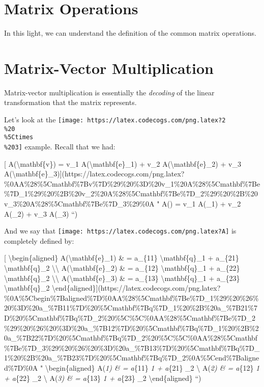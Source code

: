 \documentclass[]{article}
\begin{document}
\hypertarget{matrix-operations}{%
\section{Matrix Operations}\label{matrix-operations}}

In this light, we can understand the definition of the common matrix operations.

\hypertarget{matrix-vector-multiplication}{%
\section{Matrix-Vector Multiplication}\label{matrix-vector-multiplication}}

Matrix-vector multiplication is essentially the \emph{decoding} of the linear
transformation that the matrix represents.

Let's look at the
\texttt{[image: https://latex.codecogs.com/png.latex?2\\\%20\\\%5Ctimes\\\%203]}
example. Recall that we had:

{[} A(\textbackslash{}mathbf\{v\}) = v\_1 A(\textbackslash{}mathbf\{e\}\_1) +
v\_2 A(\textbackslash{}mathbf\{e\}\_2) + v\_3
A(\textbackslash{}mathbf\{e\}\_3){]}(https://latex.codecogs.com/png.latex?\%0AA\%28\%5Cmathbf\%7Bv\%7D\%29\%20\%3D\%20v\_1\%20A\%28\%5Cmathbf\%7Be\%7D\_1\%29\%20\%2B\%20v\_2\%20A\%28\%5Cmathbf\%7Be\%7D\_2\%29\%20\%2B\%20v\_3\%20A\%28\%5Cmathbf\%7Be\%7D\_3\%29\%0A
" A() = v\_1 A(\_1) + v\_2 A(\_2) + v\_3
A(\_3) ``)

And we say that \texttt{[image: https://latex.codecogs.com/png.latex?A]} is
completely defined by:

{[} \textbackslash{}begin\{aligned\} A(\textbackslash{}mathbf\{e\}\_1) \& =
a\_\{11\} \textbackslash{}mathbf\{q\}\_1 + a\_\{21\}
\textbackslash{}mathbf\{q\}\_2 \textbackslash{}\textbackslash{}
A(\textbackslash{}mathbf\{e\}\_2) \& = a\_\{12\} \textbackslash{}mathbf\{q\}\_1
+ a\_\{22\} \textbackslash{}mathbf\{q\}\_2 \textbackslash{}\textbackslash{}
A(\textbackslash{}mathbf\{e\}\_3) \& = a\_\{13\} \textbackslash{}mathbf\{q\}\_1
+ a\_\{23\} \textbackslash{}mathbf\{q\}\_2
\textbackslash{}end\{aligned\}{]}(https://latex.codecogs.com/png.latex?\%0A\%5Cbegin\%7Baligned\%7D\%0AA\%28\%5Cmathbf\%7Be\%7D\_1\%29\%20\%26\%20\%3D\%20a\_\%7B11\%7D\%20\%5Cmathbf\%7Bq\%7D\_1\%20\%2B\%20a\_\%7B21\%7D\%20\%5Cmathbf\%7Bq\%7D\_2\%20\%5C\%5C\%0AA\%28\%5Cmathbf\%7Be\%7D\_2\%29\%20\%26\%20\%3D\%20a\_\%7B12\%7D\%20\%5Cmathbf\%7Bq\%7D\_1\%20\%2B\%20a\_\%7B22\%7D\%20\%5Cmathbf\%7Bq\%7D\_2\%20\%5C\%5C\%0AA\%28\%5Cmathbf\%7Be\%7D\_3\%29\%20\%26\%20\%3D\%20a\_\%7B13\%7D\%20\%5Cmathbf\%7Bq\%7D\_1\%20\%2B\%20a\_\%7B23\%7D\%20\%5Cmathbf\%7Bq\%7D\_2\%0A\%5Cend\%7Baligned\%7D\%0A
" \textbackslash{}begin\{aligned\} A(\emph{1) \& = a}\{11\}
\emph{1 + a}\{21\} \_2 \textbackslash{} A(\emph{2)
\& = a}\{12\} \emph{1 + a}\{22\} \_2 \textbackslash{}
A(\emph{3) \& = a}\{13\} \emph{1 + a}\{23\} \_2
\textbackslash{}end\{aligned\} ``)
\end{document}
